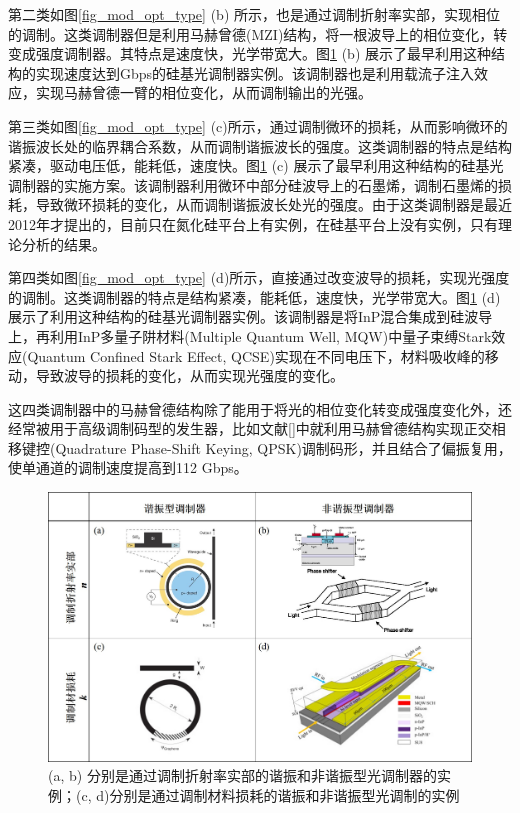 第二类如图\ref{fig_mod_opt_type} (b) 所示，也是通过调制折射率实部，实现相位的调制。这类调制器但是利用马赫曾德(MZI)结构，将一根波导上的相位变化，转变成强度调制器。其特点是速度快，光学带宽大。图\ref{fig_mod_opt_type_real} (b) 展示了最早利用这种结构的实现速度达到Gbps的硅基光调制器实例\cite{liu2004high}。该调制器也是利用载流子注入效应，实现马赫曾德一臂的相位变化，从而调制输出的光强。

第三类如图\ref{fig_mod_opt_type} (c)所示，通过调制微环的损耗，从而影响微环的谐振波长处的临界耦合系数，从而调制谐振波长的强度。这类调制器的特点是结构紧凑，驱动电压低，能耗低，速度快。图\ref{fig_mod_opt_type_real} (c) 展示了最早利用这种结构的硅基光调制器的实施方案\cite{Midrio2012graphene}。该调制器利用微环中部分硅波导上的石墨烯，调制石墨烯的损耗，导致微环损耗的变化，从而调制谐振波长处光的强度。由于这类调制器是最近2012年才提出的，目前只在氮化硅平台上有实例\cite{phare2015graphene}，在硅基平台上没有实例，只有理论分析的结果\cite{Midrio2012graphene}。

第四类如图\ref{fig_mod_opt_type} (d)所示，直接通过改变波导的损耗，实现光强度的调制。这类调制器的特点是结构紧凑，能耗低，速度快，光学带宽大。图\ref{fig_mod_opt_type_real} (d) 展示了利用这种结构的硅基光调制器实例\cite{tang201150}。该调制器是将InP混合集成到硅波导上，再利用InP多量子阱材料(Multiple Quantum Well, MQW)中量子束缚Stark效应(Quantum Confined Stark Effect, QCSE)实现在不同电压下，材料吸收峰的移动，导致波导的损耗的变化，从而实现光强度的变化。

这四类调制器中的马赫曾德结构除了能用于将光的相位变化转变成强度变化外，还经常被用于高级调制码型的发生器，比如文献[]中就利用马赫曾德结构实现正交相移键控(Quadrature Phase-Shift Keying, QPSK)调制码形，并且结合了偏振复用，使单通道的调制速度提高到112 Gbps。
\begin{figure}[htb]
	\centering
	\includegraphics[width=12cm]{./Pictures/fig_mod_opt_type_real.jpg}
	\caption{ (a, b) 分别是通过调制折射率实部的谐振和非谐振型光调制器的实例\cite{xu2005micrometre,liu2004high}；(c, d)分别是通过调制材料损耗的谐振和非谐振型光调制的实例\cite{Midrio2012graphene,tang201150}}
	\label{fig_mod_opt_type_real}
\end{figure}

